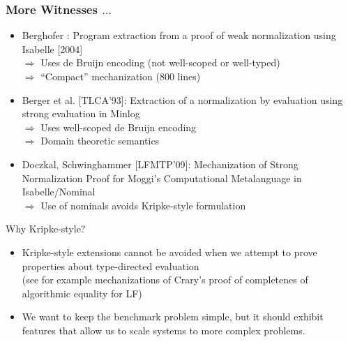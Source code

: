 \begin{frame}
  \frametitle{More Witnesses $\ldots$}

  \begin{itemize}
  \item Berghofer : Program extraction from a proof of weak
    normalization using Isabelle [2004]
\\
$\Longrightarrow$ Uses de Bruijn encoding (not well-scoped or
well-typed)\\
$\Longrightarrow$ ``Compact'' mechanization (800 lines)
\\[1em]
\pause
\item Berger et al. [TLCA'93]: Extraction of a normalization by
  evaluation using strong evaluation in Minlog\\
$\Longrightarrow$ Uses well-scoped de Bruijn encoding \\%
$\Longrightarrow$ Domain theoretic semantics
\\[1em]
\pause
\item Doczkal, Schwinghammer [LFMTP'09]:
Mechanization of Strong Normalization Proof for Moggi’s Computational
Metalanguage in Isabelle/Nominal\\
$\Longrightarrow$ Use of nominals avoids Kripke-style formulation
\end{itemize}
\end{frame}



\begin{frame}{Why Kripke-style?}

  \begin{itemize}
  \item Kripke-style extensions cannot be avoided when we attempt to
    prove properties about type-directed evaluation
\\
{\small{(see for example mechanizations of Crary's proof of
    completenes of algorithmic equality for LF)}}
\\[1em]
  \item We want to keep the benchmark problem simple, but it should
    exhibit features that allow us to scale systems to more complex problems.
  \end{itemize}


\end{frame}



